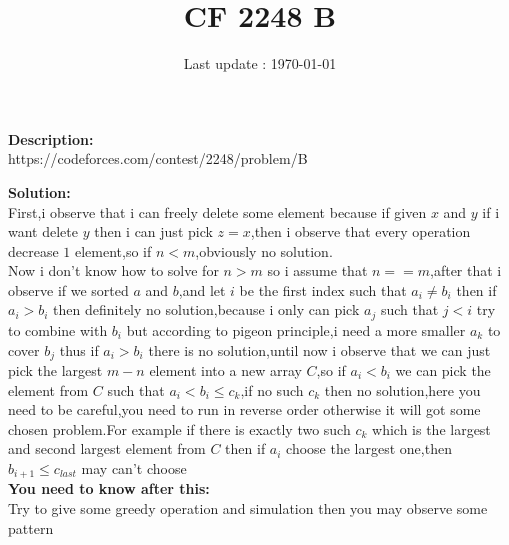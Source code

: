 \documentclass{article}
\begin{document}
\title{\textbf{CF 2248 B}}
\author{}
\date{Last update : \today}

\maketitle

\noindent \textbf{Description:}\\
https://codeforces.com/contest/2248/problem/B

\noindent \textbf{Solution:}\\
First,i observe that i can freely delete some element because if given $x$ and $y$ if i want delete $y$ then i can just pick $z=x$,then i observe that every operation decrease $1$ element,so if $n<m$,obviously no solution.\\
Now i don't know how to solve for $n>m$ so i assume that $n==m$,after that i observe if we sorted $a$ and $b$,and let $i$ be the first index such that $a_i\ne b_i$ then if $a_i>b_i$ then definitely no solution,because i only can pick $a_j$ such that $j<i$ try to combine with $b_i$ but according to pigeon principle,i need a more smaller $a_k$ to cover $b_j$ thus if $a_i>b_i$ there is no solution,until now i observe that we can just pick the largest $m-n$ element into a new array $C$,so if $a_i<b_i$ we can pick the element from $C$ such that $a_i<b_i\le c_k$,if no such $c_k$ then no solution,here you need to be careful,you need to run in reverse order otherwise it will got some chosen problem.For example if there is exactly two such $c_k$ which is the largest and second largest element from $C$ then if $a_i$ choose the largest one,then $b_{i+1}\le c_{last}$ may can't choose
\\
\noindent \textbf{You need to know after this:}\\
Try to give some greedy operation and simulation then you may observe some pattern
\end{document}
